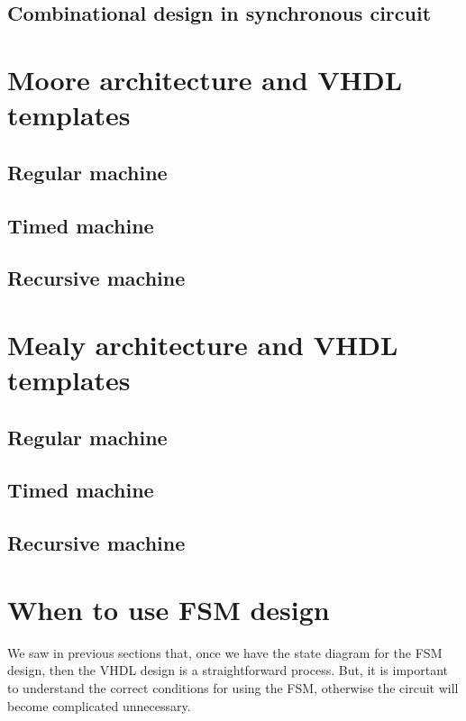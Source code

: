\subsection{Combinational design in synchronous circuit}\label{sec:glitchInsSync}



\section{Moore architecture and VHDL templates}
\subsection{Regular machine}
\subsection{Timed machine}
\subsection{Recursive machine}

\section{Mealy architecture and VHDL templates}
\subsection{Regular machine}
\subsection{Timed machine}
\subsection{Recursive machine}


\section{When to use FSM design}
We saw in previous sections that, once we have the state diagram for the FSM design, then the VHDL design is a straightforward process. But, it is important to understand the correct conditions for using the FSM, otherwise the circuit will become complicated unnecessary. 

